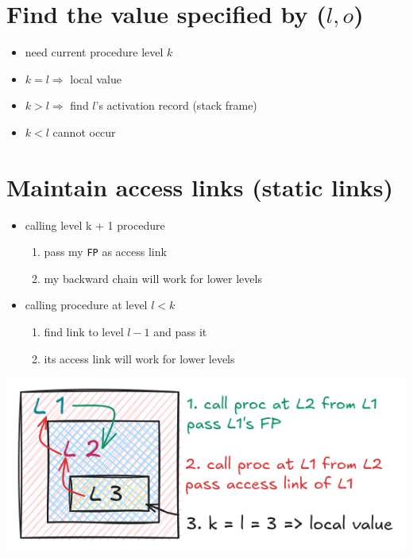 \documentclass[10pt,a4paper,landscape]{article}
\begin{document}
\begin{multicols*}{3}
\section*{Find the value specified by ($l,o$)}
\begin{itemize}
\item need current procedure level $k$
\item $k = l \Rightarrow$ local value
\item $k > l \Rightarrow$ find $l$'s activation record (stack frame)
\item $k < l$ cannot occur
\end{itemize}
\section*{Maintain access links (static links)}
\begin{itemize}
\item calling level k + 1 procedure
  \begin{enumerate}
  \item pass my \texttt{FP} as access link
  \item my backward chain will work for lower levels
  \end{enumerate}
\item calling procedure at level $l < k$
  \begin{enumerate}
  \item find link to level $l - 1$ and pass it
  \item its access link will work for lower levels
  \end{enumerate}
\end{itemize}
\begin{minipage}{\linewidth}
  \includegraphics*[width=\linewidth]{img/access_link}
\end{minipage}
\end{multicols*}
\end{document}
